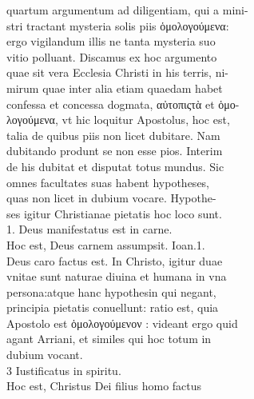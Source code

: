 \documentclass{article}
\begin{document}
\begin{pages}
                quartum argumentum ad diligentiam, qui a mini- \\
                stri tractant mysteria solis piis ὁμολογούμενα: \\
                ergo vigilandum illis ne tanta mysteria suo \\
                vitio polluant. Discamus ex hoc argumento \\
                quae sit vera Ecclesia Christi in his terris, ni- \\
                mirum quae inter alia etiam quaedam habet \\
                confessa et concessa dogmata, αὐτοπιςτὰ et ὁμο- \\
                λογούμενα, vt hic loquitur Apostolus, hoc est, \\
                talia de quibus piis non licet dubitare. Nam \\
                dubitando produnt se non esse pios. Interim \\
                de his dubitat et disputat totus mundus. Sic \\
                omnes facultates suas habent hypotheses, \\
                quas non licet in dubium vocare. Hypothe- \\
                ses igitur Christianae pietatis hoc loco sunt. \\
                1. Deus manifestatus est in carne. \\
                Hoc est, Deus carnem assumpsit. Ioan.1. \\
                Deus caro factus est. In Christo, igitur duae \\
                vnitae sunt naturae diuina et humana in vna \\
                persona:atque hanc hypothesin qui negant, \\
                principia pietatis conuellunt: ratio est, quia \\
                Apostolo est ὁμολογούμενον : videant ergo quid \\
                agant Arriani, et similes qui hoc totum in \\
                dubium vocant. \\
                3 Iustificatus in spiritu. \\
                Hoc est, Christus Dei filius homo factus \\

\end{pages}
\end{document}

